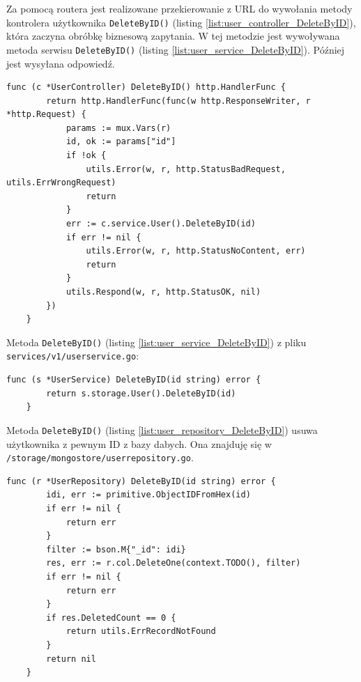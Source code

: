Za pomocą routera jest realizowane przekierowanie z URL do wywołania metody kontrolera użytkownika \texttt{DeleteByID()} (listing \ref{list:user_controller_DeleteByID}), która zaczyna obróbkę biznesową zapytania.
W tej metodzie jest wywoływana metoda serwisu \texttt{DeleteByID()} (listing \ref{list:user_service_DeleteByID}). Później jest wysyłana odpowiedź.
\begin{lstlisting}[label=list:user_controller_DeleteByID,caption=Kontroler usunięcia użytkownika,basicstyle=\tiny\ttfamily]
    func (c *UserController) DeleteByID() http.HandlerFunc {
        return http.HandlerFunc(func(w http.ResponseWriter, r *http.Request) {
            params := mux.Vars(r)
            id, ok := params["id"]
            if !ok {
                utils.Error(w, r, http.StatusBadRequest, utils.ErrWrongRequest)
                return
            }
            err := c.service.User().DeleteByID(id)
            if err != nil {
                utils.Error(w, r, http.StatusNoContent, err)
                return
            }
            utils.Respond(w, r, http.StatusOK, nil)
        })
    }
\end{lstlisting}
Metoda \texttt{DeleteByID()} (listing \ref{list:user_service_DeleteByID}) z pliku \texttt{services/v1/userservice.go}:
\begin{lstlisting}[label=list:user_service_DeleteByID,caption=Serwis usunięcia użytkownika,basicstyle=\tiny\ttfamily]
    func (s *UserService) DeleteByID(id string) error {
        return s.storage.User().DeleteByID(id)
    }
\end{lstlisting}
% 
Metoda \texttt{DeleteByID()} (listing \ref{list:user_repository_DeleteByID}) usuwa użytkownika z pewnym ID z bazy dabych.
Ona znajduję się w \texttt{/storage/mongostore/userrepository.go}.
\begin{lstlisting}[label=list:user_repository_DeleteByID,caption=Usunięcie uzytkownika z bazy danych,basicstyle=\tiny\ttfamily]
    func (r *UserRepository) DeleteByID(id string) error {
        idi, err := primitive.ObjectIDFromHex(id)
        if err != nil {
            return err
        }
        filter := bson.M{"_id": idi}
        res, err := r.col.DeleteOne(context.TODO(), filter)
        if err != nil {
            return err
        }
        if res.DeletedCount == 0 {
            return utils.ErrRecordNotFound
        }
        return nil
    }
\end{lstlisting}

